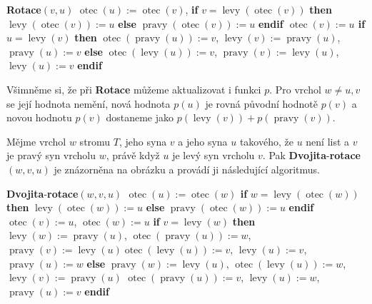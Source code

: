 \documentclass[a4paper,12pt]{article}
\DeclareMathOperator*{\otec}{otec}
\DeclareMathOperator*{\levy}{levy}
\DeclareMathOperator*{\pravy}{pravy}
\begin{document}
\midinsert
\centerline{}
\endcaption
\endinsert

{\bf Rotace$(v,u)$\newline} 
$\otec(u):=\otec(v)$,\newline 
{\bf if} $v=\levy(\otec(v))$ {\bf then}\newline 
\phantom{---}$\levy(\otec(v)):=u$\newline 
{\bf else}\newline 
\phantom{---}$\pravy(\otec(v)):=u$\newline 
{\bf endif\newline 
$\otec(v):=u$\newline 
if} $u=\levy(v)$ {\bf then}\newline 
\phantom{---}$\otec(\pravy(u)):=v$, $\levy(v):=\pravy(u)$, $\pravy(u):=v$\newline 
{\bf else}\newline 
\phantom{---}$\otec(\levy(u)):=v$, $\pravy(v):=\levy(u)$, $\levy(u):=v$\newline 
{\bf endif}

Všimněme si, že při {\bf Rotace} můžeme 
aktualizovat i funkci $p$. Pro vrchol $w\ne u,v$ se její hodnota 
nemění, nová hodnota $p(u)$ je rovná původní hodnotě 
$p(v)$ a novou hodnotu $p(v)$ dostaneme jako 
$p(\levy(v))+p(\pravy(v))$.

Mějme vrchol $w$ stromu $T$, jeho syna $v$ a jeho 
syna $u$ takového, že $u$ není list a $v$ je pravý syn 
vrcholu $w$, právě když $u$ je levý syn vrcholu $v$. Pak 
{\bf Dvojita}-{\bf rotace$(w,v,u)$} je znázorněna na obrázku a provádí 
ji následující algoritmus.

\midinsert
\centerline{}
\endcaption
\endinsert

{\bf Dvojita}-{\bf rotace$(w,v,u)$\newline 
$\otec(u):=\otec(w)$\newline 
if} $w=\levy(\otec(w))$ {\bf then}\newline 
\phantom{---}$\levy(\otec(w)):=u$\newline 
{\bf else}\newline 
\phantom{---}$\pravy(\otec(w)):=u$\newline 
{\bf endif}\newline 
$\otec(v):=u$, $\otec(w):=u$\newline 
{\bf if} $v=\levy(w)$ {\bf then}\newline  
\phantom{---}$\levy(w):=\pravy(u)$, $\otec(\pravy(u)):=w$, $\pravy(v):=\levy(u)$\newline \phantom{---}$\otec(\levy(u)):=v$, $\levy(u):=v$, $\pravy(u):=w$\newline 
{\bf else}\newline 
\phantom{---}$\pravy(w):=\levy(u)$, $\otec(\levy(u)):=w$, $\levy(v):=\pravy(u)$\newline 
\phantom{---}$\otec(\pravy(u)):=v$, $\levy(u):=w$, $\pravy(u):=v$\newline 
{\bf endif}
\end{document}
